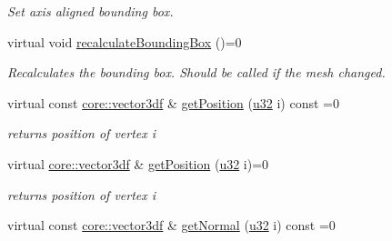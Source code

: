 \begin{DoxyCompactItemize}
\begin{DoxyCompactList}\small\item\em Set axis aligned bounding box. \end{DoxyCompactList}\item 
\mbox{\label{classirr_1_1scene_1_1IMeshBuffer_a161877fc3afe29a816440db12a71785d}} 
virtual void \hyperlink{classirr_1_1scene_1_1IMeshBuffer_a161877fc3afe29a816440db12a71785d}{recalculate\+Bounding\+Box} ()=0
\begin{DoxyCompactList}\small\item\em Recalculates the bounding box. Should be called if the mesh changed. \end{DoxyCompactList}\item 
\mbox{\label{classirr_1_1scene_1_1IMeshBuffer_a79ca051edc0ece69057fda7b4fe1e155}} 
virtual const \hyperlink{namespaceirr_1_1core_a06f169d08b5c429f5575acb7edbad811}{core\+::vector3df} \& \hyperlink{classirr_1_1scene_1_1IMeshBuffer_a79ca051edc0ece69057fda7b4fe1e155}{get\+Position} (\hyperlink{namespaceirr_a0416a53257075833e7002efd0a18e804}{u32} i) const =0
\begin{DoxyCompactList}\small\item\em returns position of vertex i \end{DoxyCompactList}\item 
\mbox{\label{classirr_1_1scene_1_1IMeshBuffer_a66cbd49a55fd0bfffffced149902bba3}} 
virtual \hyperlink{namespaceirr_1_1core_a06f169d08b5c429f5575acb7edbad811}{core\+::vector3df} \& \hyperlink{classirr_1_1scene_1_1IMeshBuffer_a66cbd49a55fd0bfffffced149902bba3}{get\+Position} (\hyperlink{namespaceirr_a0416a53257075833e7002efd0a18e804}{u32} i)=0
\begin{DoxyCompactList}\small\item\em returns position of vertex i \end{DoxyCompactList}\item 
\mbox{\label{classirr_1_1scene_1_1IMeshBuffer_a067c78a395736da9ace45e367cb7e2e5}} 
virtual const \hyperlink{namespaceirr_1_1core_a06f169d08b5c429f5575acb7edbad811}{core\+::vector3df} \& \hyperlink{classirr_1_1scene_1_1IMeshBuffer_a067c78a395736da9ace45e367cb7e2e5}{get\+Normal} (\hyperlink{namespaceirr_a0416a53257075833e7002efd0a18e804}{u32} i) const =0

\end{DoxyCompactItemize}
